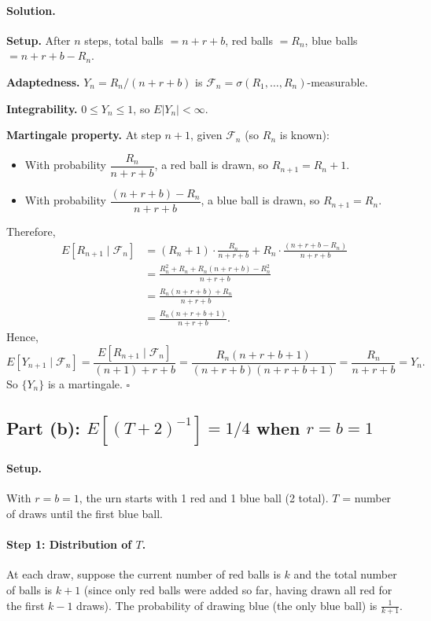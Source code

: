 \documentclass[11pt]{article}
\newcommand{\1}{\mathbf{1}}
\theoremstyle{plain}
\begin{document}
\paragraph{Solution.}

\textbf{Setup.} After $n$ steps, total balls $= n+r+b$, red balls $= R_n$, blue balls $= n+r+b-R_n$.

\textbf{Adaptedness.} $Y_n=R_n/(n+r+b)$ is $\mathcal{F}_n=\sigma(R_1,\ldots,R_n)$-measurable.

\textbf{Integrability.} $0\le Y_n\le1$, so $E|Y_n|<\infty$.

\textbf{Martingale property.} At step $n+1$, given $\mathcal{F}_n$ (so $R_n$ is known):
\begin{itemize}
  \item With probability $\dfrac{R_n}{n+r+b}$, a red ball is drawn, so $R_{n+1}=R_n+1$.
  \item With probability $\dfrac{(n+r+b)-R_n}{n+r+b}$, a blue ball is drawn, so $R_{n+1}=R_n$.
\end{itemize}
Therefore,
\begin{align*}
  E[R_{n+1}\mid\mathcal{F}_n]
  &= (R_n+1)\cdot\frac{R_n}{n+r+b}
    + R_n\cdot\frac{(n+r+b-R_n)}{n+r+b} \\
  &= \frac{R_n^2+R_n + R_n(n+r+b)-R_n^2}{n+r+b} \\
  &= \frac{R_n(n+r+b) + R_n}{n+r+b} \\
  &= \frac{R_n(n+r+b+1)}{n+r+b}.
\end{align*}
Hence,
\[
  E[Y_{n+1}\mid\mathcal{F}_n]
  = \frac{E[R_{n+1}\mid\mathcal{F}_n]}{(n+1)+r+b}
  = \frac{R_n(n+r+b+1)}{(n+r+b)(n+r+b+1)}
  = \frac{R_n}{n+r+b}
  = Y_n.
\]
So $\{Y_n\}$ is a martingale. $\square$

\subsection*{Part (b): $E[(T+2)^{-1}]=1/4$ when $r=b=1$}

\paragraph{Setup.}
With $r=b=1$, the urn starts with 1 red and 1 blue ball (2 total). $T$ = number of
draws until the first blue ball.

\paragraph{Step 1: Distribution of $T$.}
At each draw, suppose the current number of red balls is $k$ and the total number of
balls is $k+1$ (since only red balls were added so far, having drawn all red for the
first $k-1$ draws). The probability of drawing blue (the only blue ball) is $\frac{1}{k+1}$.
\end{document}
